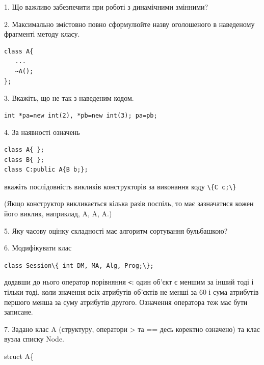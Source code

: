 \documentclass[12pt, ukrainian]{article}
\def\code#1{\Verb!#1!}
\begin{document}
{%
1. Що важливо забезпечити при роботі з динамічними змінними?%
\par
\vspace{2mm}
2. Максимально змістовно повно сформулюйте назву оголошеного в наведеному фрагменті методу класу.
\vspace{-3mm}
\begin{verbatim}class A{
   ...
   ~A();
};\end{verbatim}
\vspace{-3mm}
\par
\vspace{2mm}
3. Вкажіть, що не так з наведеним кодом.
\vspace{-3mm}
\begin{verbatim}int *pa=new int(2), *pb=new int(3); pa=pb;\end{verbatim}
\vspace{-3mm}
\par
\vspace{2mm}
4. За наявності означень
\vspace{-3mm}
\begin{verbatim}
class A{ };
class B{ };
class C:public A{B b;};\end{verbatim}
\vspace{-3mm}
вкажіть послідовність викликів конструкторів за виконання коду \code{\{C c;\}} 

(Якщо конструктор викликається кілька разів поспіль, то має зазначатися кожен його виклик, наприклад, A, A, A.)

\vspace{2mm}
5. Яку часову оцінку складності має алгоритм сортування бульбашкою?
\par
\vspace{2mm}
6. Модифікувати клас 

\qquad\code{class Session\{ int DM, MA, Alg, Prog;\};} 


додавши до нього оператор порівняння \code{<}: один об'єкт є меншим за інший тоді і тільки тоді, коли значення всіх атрибутів об'єктів не менші за 60 і сума атрибутів першого менша за суму атрибутів другого. Означення оператора теж має бути записане.%
\par
\vspace{2mm}
7. 
Задано клас A (структуру, оператори > та == десь коректно означено) та клас вузла списку Node.

struct A\{

}
\end{document}
